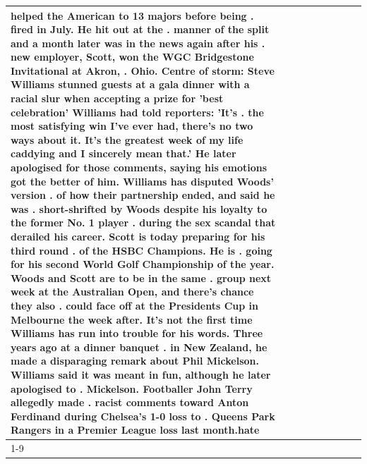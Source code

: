 \begin{table}[H]
\begin{tabular}{lllrlllll}
helped the American to 13 majors before being . fired in July. He hit out at the . manner of the split and a month later was in the news again after his . new employer, Scott, won the WGC Bridgestone Invitational at Akron, . Ohio. Centre of storm: Steve Williams stunned guests at a gala dinner with a racial slur when accepting a prize for 'best celebration' Williams had told reporters: 'It's . the most satisfying win I've ever had, there's no two ways about it. It's the greatest week of my life caddying and I sincerely mean that.' He later apologised for those comments, saying his emotions got the better of him. Williams has disputed Woods' version . of how their partnership ended, and said he was . short-shrifted by Woods despite his loyalty to the former No. 1 player . during the sex scandal that derailed his career. Scott is today preparing for his third round . of the HSBC Champions. He is . going for his second World Golf Championship of the year. Woods and Scott are to be in the same . group next week at the Australian Open, and there's chance they also . could face off at the Presidents Cup in Melbourne the week after. It's not the first time Williams has run into trouble for his words. Three years ago at a dinner banquet . in New Zealand, he made a disparaging remark about Phil Mickelson. Williams said it was meant in fun, although he later apologised to . Mickelson. Footballer John Terry allegedly made . racist comments toward Anton Ferdinand during Chelsea's 1-0 loss to . Queens Park Rangers in a Premier League loss last month.hate \\
\cline{1-9}

\end{tabular}
\end{table}

